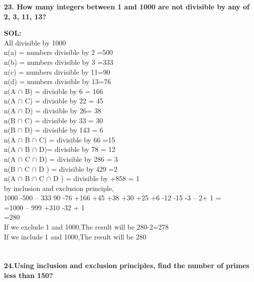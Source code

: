\documentclass[8pt,a4paper]{article}
\begin{document}
\textbf{23. How many integers between 1 and 1000 are not divisible by any of 2, 3, 11, 13?}

\textbf{SOL:}\\All divisible by 1000\\
n(a) = numbers divisible by 2 =500\\
n(b) = numbers divisible by 3 =333\\
n(c) = numbers divisible by 11=90\\
n(d) = numbers divisible by 13=76\\
n(A $\cap$ B) = divisible by 6 = 166\\
n(A $\cap$ C) = divisible by 22 = 45\\
n(A $\cap$ D) = divisible by 26= 38 \\
n(B $\cap$ C) = divisible by 33 = 30\\
n(B $\cap$ D) = divisible by 143 = 6\\
n(A $\cap$ B $\cap$ C) = divisible by 66 =15\\
n(A $\cap$ B $\cap$ D)= divisible by 78 = 12\\
n(A $\cap$ C $\cap$ D) = divisible by 286 = 3\\
 n(B $\cap$ C $\cap$ D ) = divisible by 429 =2\\
n(A $\cap$ B $\cap$ C $\cap$ D ) = divisible by  +858 = 1\\
by inclusion and exclusion principle,\\
1000 -500 – 333 90 -76 +166 +45 +38 +30 +25 +6 -12 -15 -3 – 2+ 1 = \\
=1000 – 999 +310 -32 + 1\\
=280\\If we exclude 1 and 1000,The result will be 280-2=278\\If we include 1 and 1000,The result will be 280\\





\section{}

\textbf{24.Using inclusion and exclusion principles, find the number of primes less than 150?}
\end{document}
